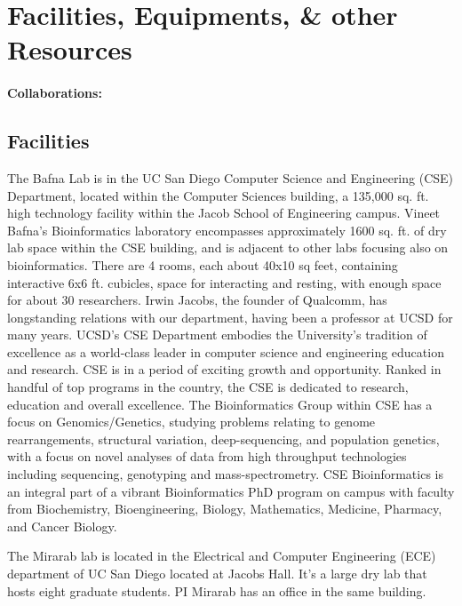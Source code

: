 \section*{Facilities, Equipments, \& other Resources}

\paragraph{Collaborations:}




\subsection*{Facilities}

The Bafna Lab is in the UC San Diego Computer Science and Engineering (CSE) Department, located within the Computer Sciences building, a 135,000 sq. ft. high technology facility within the Jacob School of Engineering campus. Vineet Bafna's Bioinformatics laboratory encompasses approximately 1600 sq. ft. of dry lab space within the CSE building, and is adjacent to other labs focusing also on bioinformatics. There are 4 rooms, each about 40x10 sq feet, containing interactive 6x6 ft. cubicles, space for interacting and resting, with enough space for about 30 researchers. 
Irwin Jacobs, the founder of Qualcomm, has longstanding relations with our department, having been a professor at UCSD for many years. UCSD’s CSE Department embodies the University's tradition of excellence as a world-class leader in computer science and engineering education and research. CSE is in a period of exciting growth and opportunity. Ranked in handful of top programs in the country, the CSE is dedicated to research, education and overall excellence. The Bioinformatics Group within CSE has a focus on Genomics/Genetics, studying problems relating to genome rearrangements, structural variation, deep-sequencing, and population genetics, with a focus on novel analyses of data from high throughput technologies including sequencing, genotyping and mass-spectrometry. CSE Bioinformatics is an integral part of a vibrant Bioinformatics PhD program on campus with faculty from Biochemistry, Bioengineering, Biology, Mathematics, Medicine, Pharmacy, and Cancer Biology. 

The Mirarab lab is located in the Electrical and Computer Engineering (ECE) department of UC San Diego located at Jacobs Hall. It's a large dry lab that hosts eight graduate students. PI Mirarab has an office in the same building.

